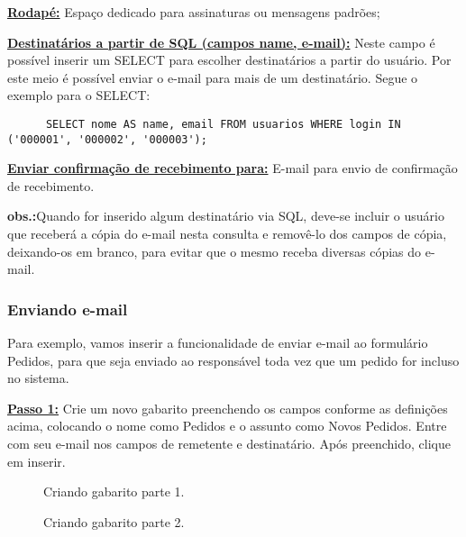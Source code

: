 \documentclass[9pt]{report}
\begin{document}
{      \underline{\textbf{Rodapé:}} Espaço dedicado para assinaturas
      ou mensagens padrões;
      
      \underline{\textbf{Destinatários a partir de SQL (campos name, e-mail):}} Neste campo é possível inserir um SELECT para escolher
      destinatários a partir do usuário. Por este meio é possível
      enviar o e-mail para mais de um destinatário. Segue o exemplo
      para o SELECT:

      \begin{lstlisting}
      SELECT nome AS name, email FROM usuarios WHERE login IN ('000001', '000002', '000003');
      \end{lstlisting}
      
      \underline{\textbf{Enviar confirmação de recebimento para:}}
      E-mail para envio de confirmação de recebimento.

      \textbf{obs.:}Quando for inserido algum destinatário via SQL,
      deve-se incluir o usuário que receberá a cópia do e-mail nesta
      consulta e removê-lo dos campos de cópia, deixando-os em
      branco, para evitar que o mesmo receba diversas cópias do
      e-mail.    
          
      \subsubsection{Enviando e-mail}

      Para exemplo, vamos inserir a funcionalidade de enviar e-mail
      ao formulário Pedidos, para que seja enviado ao responsável
      toda vez que um pedido for incluso no sistema.


      \underline{\textbf{Passo 1:}} Crie um novo gabarito preenchendo
      os campos conforme as definições acima, colocando o nome como
      Pedidos e o assunto como Novos Pedidos. Entre com seu e-mail
      nos campos de remetente e destinatário. Após preenchido, clique
      em inserir.

      \begin{figure}[H]
        \caption{Criando gabarito parte 1.}
        \label{fig:criandogabaritosemail1}
      \end{figure}

      \begin{figure}[H]
        \caption{Criando gabarito parte 2.}
        \label{fig:criandogabaritosemail2}
      \end{figure}

}
\end{document}
